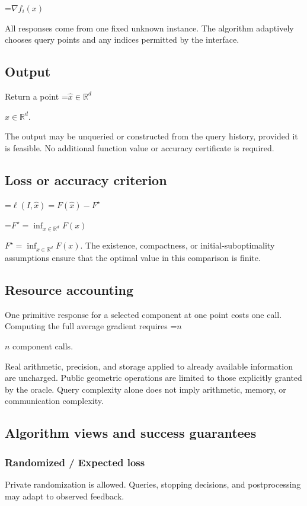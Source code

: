 \documentclass[10pt,a4paper]{article}
\newcommand{\AtlasMath}[1]{\par\begingroup\centering\setbox0=\hbox{$\displaystyle #1$}\ifdim\wd0>1.4\linewidth\typeout{ATLAS WIDE FORMULA: \the\wd0}\fi\ifdim\wd0>\linewidth\resizebox{\linewidth}{!}{\box0}\else\box0\fi\par\endgroup}
\newcommand{\AtlasInlineMath}[1]{\begingroup\setbox0=\hbox{$#1$}\ifdim\wd0>.4\linewidth\endgroup\AtlasMath{#1}\else\endgroup$#1$\fi}
\begin{document}
\AtlasMath{\nabla f_i(x)}


All responses come from one fixed unknown instance. The algorithm adaptively chooses query points and any indices permitted by the interface.

\subsection{Output}
Return a point \AtlasInlineMath{\widehat x\in\mathbb R^d}.

The output may be unqueried or constructed from the query history, provided it is feasible. No additional function value or accuracy certificate is required.

\subsection{Loss or accuracy criterion}

\AtlasMath{\ell(I,\widehat{x})=F(\widehat{x})-F^\star}


\AtlasInlineMath{F^\star=\inf_{x\in \mathbb{R}^d}F(x)}. The existence, compactness, or initial-suboptimality assumptions ensure that the optimal value in this comparison is finite.

\subsection{Resource accounting}
One primitive response for a selected component at one point costs one call. Computing the full average gradient requires \AtlasInlineMath{n} component calls.

Real arithmetic, precision, and storage applied to already available information are uncharged. Public geometric operations are limited to those explicitly granted by the oracle. Query complexity alone does not imply arithmetic, memory, or communication complexity.

\subsection{Algorithm views and success guarantees}
\subsubsection{Randomized / Expected loss}
Private randomization is allowed. Queries, stopping decisions, and postprocessing may adapt to observed feedback.
\end{document}
